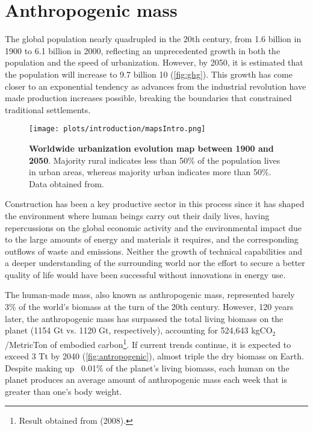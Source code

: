 \section[Anthropogenic mass]{Anthropogenic mass}
\label{sec:anthropogenic_mass}

The global population nearly quadrupled in the 20th century, from 1.6 billion in 1900 to 6.1 billion in 2000, reflecting an unprecedented growth in both the population and the speed of urbanization.\autocite{krausmann2009growth} However, by 2050, it is estimated that the population will increase to 9.7 billion 10 (\autoref{fig:ghg}). This growth has come closer to an exponential tendency as advances from the industrial revolution have made production increases possible, breaking the boundaries that constrained traditional settlements.

\begin{figure}[ht!]
  \centering
  \texttt{[image: plots/introduction/mapsIntro.png]}
  \caption[Worldwide urbanization evolution map between 1900 and 2050]{\textbf{Worldwide urbanization evolution map between 1900 and 2050}. Majority rural indicates less than 50\% of the population lives in urban areas, whereas majority urban indicates more than 50\%. Data obtained from.\autocite{ourworldindata_2020}}
  \label{fig:ghg}
\end{figure}

Construction has been a key productive sector in this process since it has shaped the environment where human beings carry out their daily lives, having repercussions on the global economic activity and the environmental impact due to the large amounts of energy and materials it requires,\autocite{cuchi2014building} and the corresponding outflows of waste and emissions.\autocite{krausmann2009growth} Neither the growth of technical capabilities and a deeper understanding of the surrounding world nor the effort to secure a better quality of life would have been successful without innovations in energy use.\autocite{smil2000energy} 

The human-made mass, also known as anthropogenic mass, represented barely 3\% of the world's biomass at the turn of the 20th century. However, 120 years later, the anthropogenic mass has surpassed the total living biomass on the planet (1154 Gt vs. 1120 Gt, respectively), accounting for 524,643 kgCO$_2$/MetricTon of embodied carbon\footnote{Result obtained from\autocite{calkins2008materials} (2008).}. If current trends continue, it is expected to exceed 3 Tt by 2040 (\autoref{fig:antropogenic}), almost triple the dry biomass on Earth. Despite making up ~0.01\% of the planet's living biomass, each human on the planet produces an average amount of anthropogenic mass each week that is greater than one’s body weight.\autocite{elhacham2020global}

